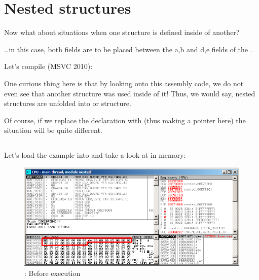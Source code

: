 \section{Nested structures}

Now what about situations when one structure is defined inside of another?



\dots in this case, both  fields are to be placed between the a,b and d,e fields of
the .

Let's compile (MSVC 2010):



One curious thing here is that by looking onto this assembly code, we do not even see that
another structure was used inside of it!
Thus, we would say, nested structures are unfolded into  or  structure.

Of course, if we replace the  declaration with  
(thus making a pointer here) the situation will be quite different.

\clearpage
\subsection{\olly}
\myindex{\olly}

Let's load the example into \olly and take a look at 
 in memory:

\begin{figure}[H]
\centering
\includegraphics[scale=\FigScale]{patterns/15_structs/5_nested/olly.png}
\caption{\olly: Before \printf execution}
\label{fig:nested_olly}
\end{figure}

